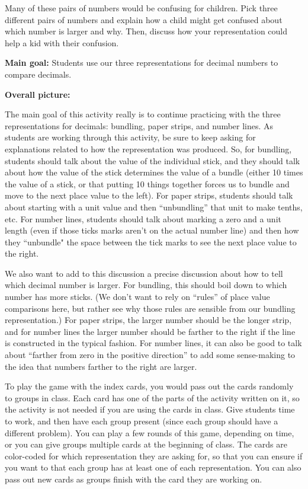 \documentclass{ximera}
\begin{document}
\begin{problem}
Many of these pairs of numbers would be confusing for children. Pick three different pairs of numbers and explain how a child might get confused about which number is larger and why. Then, discuss how your representation could help a kid with their confusion.
\end{problem}

\newpage
\begin{instructorNotes}

{\bf Main goal:} Students use our three representations for decimal numbers to compare decimals.

{\bf Overall picture:}

The main goal of this activity really is to continue practicing with the three representations for decimals: bundling, paper strips, and number lines. As students are working through this activity, be sure to keep asking for explanations related to how the representation was produced. So, for bundling, students should talk about the value of the individual stick, and they should talk about how the value of the stick determines the value of a bundle (either 10 times the value of a stick, or that putting 10 things together forces us to bundle and move to the next place value to the left). For paper strips, students should talk about starting with a unit value and then ``unbundling'' that unit to make tenths, etc. For number lines, students should talk about marking a zero and a unit length (even if those ticks marks aren't on the actual number line) and then how they ``unbundle" the space between the tick marks to see the next place value to the right.

We also want to add to this discussion a precise discussion about how to tell which decimal number is larger. For bundling, this should boil down to which number has more sticks. (We don't want to rely on ``rules'' of place value comparisons here, but rather see why those rules are sensible from our bundling representation.) For paper strips, the larger number should be the longer strip, and for number lines the larger number should be farther to the right if the line is constructed in the typical fashion. For number lines, it can also be good to talk about ``farther from zero in the positive direction'' to add some sense-making to the idea that numbers farther to the right are larger.

To play the game with the index cards, you would pass out the cards randomly to groups in class. Each card has one of the parts of the activity written on it, so the activity is not needed if you are using the cards in class. Give students time to work, and then have each group present (since each group should have a different problem). You can play a few rounds of this game, depending on time, or you can give groups multiple cards at the beginning of class. The cards are color-coded for which representation they are asking for, so that you can ensure if you want to that each group has at least one of each representation. You can also pass out new cards as groups finish with the card they are working on.


\end{instructorNotes}
\end{document}
